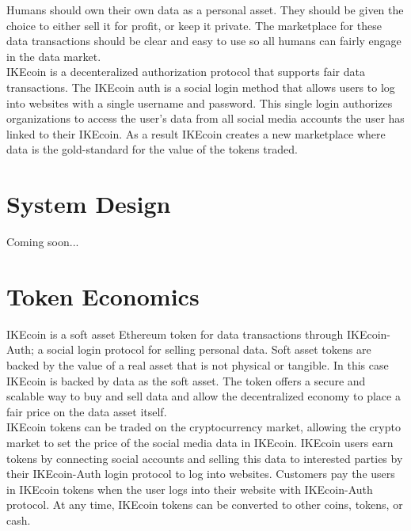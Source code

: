 \documentclass[12pt, letterpaper, twoside]{article}
\begin{document}
Humans should own their own data as a personal asset. They should be given the choice to either sell it for profit, or keep it private. The marketplace for these data transactions should be clear and easy to use so all humans can fairly engage in the data market. \\

IKEcoin is a decenteralized authorization protocol that supports fair data transactions. The IKEcoin auth is a social login method that allows users to log into websites with a single username and password. This single login authorizes organizations to access the user's data from all social media accounts the user has linked to their IKEcoin. As a result IKEcoin creates a new marketplace where data is the gold-standard for the value of the tokens traded. \\

\section{System Design}
Coming soon...


\section{Token Economics}
IKEcoin is a soft asset Ethereum token for data transactions through IKEcoin-Auth; a social login protocol for selling personal data. Soft asset tokens are backed by the value of a real asset that is not physical or tangible. In this case IKEcoin is backed by data as the soft asset. The token offers a secure and scalable way to buy and sell data and allow the decentralized economy to place a fair price on the data asset itself. \\

IKEcoin tokens can be traded on the cryptocurrency market, allowing the crypto market to set the price of the social media data in IKEcoin. IKEcoin users earn tokens by connecting social accounts and selling this data to interested parties by their IKEcoin-Auth login protocol to log into websites. Customers pay the users in IKEcoin tokens when the user logs into their website with IKEcoin-Auth protocol. At any time, IKEcoin tokens can be converted to other coins, tokens, or cash. \\
\end{document}
